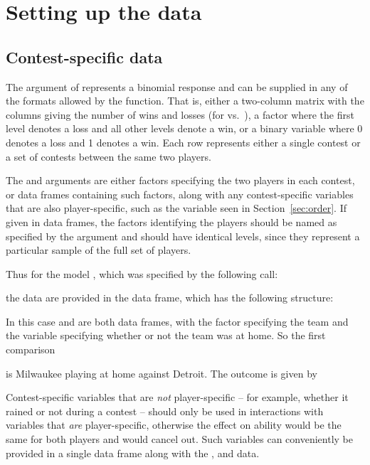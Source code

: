 \section{Setting up the data}
\label{sec:data}

\subsection{Contest-specific data}
\label{sec:contest}

The  argument of  represents a
binomial response and can be supplied in any of the formats allowed by the
 function. That is, either a two-column matrix with the columns
giving the number of wins and losses (for  vs.\ ),
a factor where the first level denotes a loss and all other levels denote a
win, or a binary variable where 0 denotes a loss and 1 denotes a win. Each row
represents either a single contest or a set of contests between the same two players.

The  and  arguments are either factors
specifying the two players in each contest, or data frames containing such factors, along
with any contest-specific variables that are also player-specific, such as the
 variable seen in Section~\ref{sec:order}. If given in data
frames, the factors identifying the players should be named as specified by the
 argument and should have identical levels, since they represent a
particular sample of the full set of players.

Thus for the model , which was specified by the following call:

\Rcodeplaceholder{}

the data are provided in the  data frame, which has the
following structure:

\Rcodeplaceholder{}

In this case  and  are both data frames, with
the factor  specifying the team and the variable 
specifying whether or not the team was at home. So the first comparison

\Rcodeplaceholder{}

is Milwaukee playing at home against Detroit. The outcome is given by

\Rcodeplaceholder{}


Contest-specific variables that are \emph{not} player-specific -- for example,
whether it rained or not during a contest -- should only be used in
interactions with variables that \emph{are} player-specific, otherwise the
effect on ability would be the same for both players and would cancel
out. Such variables can conveniently be provided in a single data frame along with the
,  and  data.

